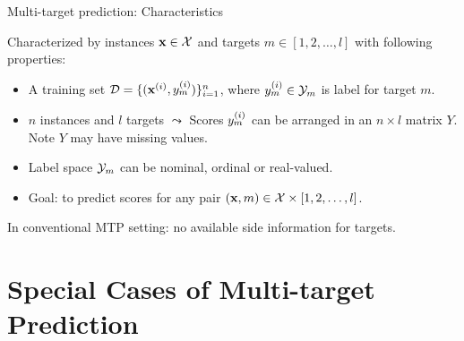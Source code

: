 \documentclass[11pt,compress,t,notes=noshow, xcolor=table]{beamer}
\begin{document}
\begin{frame}{Multi-target prediction: Characteristics}

    Characterized by instances $\mathbf{x} \in \mathcal{X}$ and targets $m \in [1, 2, \ldots, l]$ with following properties: 

    \begin{itemize} \small

        \item A training set $\mathcal{D} = \{(\mathbf{x}^{(i)}, y^{(i)}_m)\}_{i=1}^n$, where $y^{(i)}_m \in \mathcal{Y}_m$ is label for target $m$.  
        
        \item $n$ instances and $l$ targets $\leadsto$ Scores $y^{(i)}_m$ can be arranged in an $n \times l$ matrix $Y$. Note $Y$ may have missing values.

        \item Label space $\mathcal{Y}_m$ can be nominal, ordinal or real-valued.  
    
        \item Goal: to predict scores for any pair $(\mathbf{x}, m) \in \mathcal{X} \times [1, 2, \ldots, l]$.  
    
    \end{itemize}
In conventional MTP setting: no available side information for targets. 
\end{frame}

\section{Special Cases of Multi-target Prediction}
\end{document}
